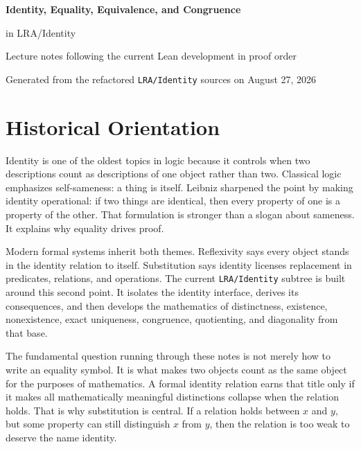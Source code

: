 \documentclass[11pt]{article}
\newcommand{\leaninline}[1]{\texttt{#1}}
\begin{document}
\begin{center}
  {\LARGE \textbf{Identity, Equality, Equivalence, and Congruence} \par}
  \vspace{0.2em}
  {\LARGE \ttfamily in LRA/Identity \par}
  \vspace{0.75em}
  {\large Lecture notes following the current Lean development in proof order\par}
  \vspace{0.5em}
  {\normalsize Generated from the refactored \texttt{LRA/Identity} sources on August 27, 2026\par}
\end{center}

\tableofcontents
\newpage

\section{Historical Orientation}

Identity is one of the oldest topics in logic because it controls when two descriptions count as descriptions of one object rather than two. Classical logic emphasizes self-sameness: a thing is itself. Leibniz sharpened the point by making identity operational: if two things are identical, then every property of one is a property of the other. That formulation is stronger than a slogan about sameness. It explains why equality drives proof.

Modern formal systems inherit both themes. Reflexivity says every object stands in the identity relation to itself. Substitution says identity licenses replacement in predicates, relations, and operations. The current \leaninline{LRA/Identity} subtree is built around this second point. It isolates the identity interface, derives its consequences, and then develops the mathematics of distinctness, existence, nonexistence, exact uniqueness, congruence, quotienting, and diagonality from that base.

The fundamental question running through these notes is not merely how to write an equality symbol. It is what makes two objects count as the same object for the purposes of mathematics. A formal identity relation earns that title only if it makes all mathematically meaningful distinctions collapse when the relation holds. That is why substitution is central. If a relation holds between \(x\) and \(y\), but some property can still distinguish \(x\) from \(y\), then the relation is too weak to deserve the name identity.
\end{document}
